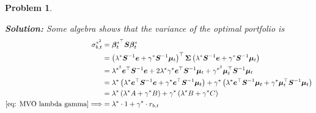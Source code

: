 \documentclass[11pt]{article}
\theoremstyle{plain} %
\newtheorem{problem}[theorem]{Problem}
\newenvironment{solution}
{\color{C2}\normalfont\begin{framed}\begingroup\textbf{Solution:} }
  {\endgroup\end{framed}}
\theoremstyle{remark}
\begin{document}
\begin{problem}
\begin{enumerate}[label=(\alph*)]
\begin{solution}
          Some algebra shows that the variance of the optimal portfolio is
          \begin{align*}
            \sigma_{b,t}^{*^2}                          & =\boldsymbol{\beta}_t^{*^{\top}} \boldsymbol{S}\boldsymbol{\beta}_t^*                                                                                                                                                                                                                                                                 \\
                                                        & =\left(\lambda^* \boldsymbol{S}^{-1} \boldsymbol{e}+\gamma^* \boldsymbol{S}^{-1} \boldsymbol{\mu}_t\right)^{\top} \boldsymbol{\Sigma}\left(\lambda^* \boldsymbol{S}^{-1} \boldsymbol{e}+\gamma^* \boldsymbol{S}^{-1} \boldsymbol{\mu}_t\right)                                                                                        \\
                                                        & =\lambda^{*^2} \boldsymbol{e}^{\top} \boldsymbol{S}^{-1} \boldsymbol{e}+2 \lambda^* \gamma^* \boldsymbol{e}^{\top} \boldsymbol{S}^{-1} \boldsymbol{\mu}_t+\gamma^{*^2} \boldsymbol{\mu}_t^{\top} \boldsymbol{S}^{-1} \boldsymbol{\mu}_t                                                                                               \\
                                                        & =\lambda^*\left(\lambda^* \boldsymbol{e}^{\top} \boldsymbol{S}^{-1} \boldsymbol{e}+\gamma^* \boldsymbol{e}^{\top} \boldsymbol{S}^{-1} \boldsymbol{\mu}_t\right)+\gamma^*\left(\lambda^* \boldsymbol{e}^{\top} \boldsymbol{S}^{-1} \boldsymbol{\mu}_t+\gamma^* \boldsymbol{\mu}_t^{\top} \boldsymbol{S}^{-1} \boldsymbol{\mu}_t\right) \\
                                                        & =\lambda^*\left(\lambda^* A+\gamma^* B\right)+\gamma^*\left(\lambda^* B+\gamma^* C\right)                                                                                                                                                                                                                                             \\
            \cref{eq: MVO lambda gamma} \Longrightarrow & =\lambda^* \cdot 1+\gamma^* \cdot r_{b, t}                                                                                                                                                                                                                                                                                            \\

\end{align*}
\end{solution}
\end{enumerate}
\end{problem}
\end{document}
